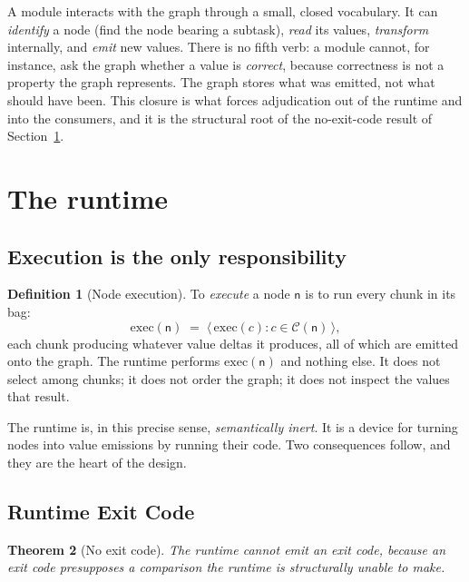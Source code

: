 \documentclass[11pt,a4paper,twocolumn]{article}
\newtheorem{theorem}{Theorem}
\theoremstyle{definition}
\newtheorem{definition}[theorem]{Definition}
\newcommand{\node}{\mathsf{n}}
\newcommand{\Chunks}{\mathcal{C}}
\newcommand{\dispatch}{\mathrm{exec}}
\begin{document}
A module interacts with the graph through a small, closed vocabulary. It can
\emph{identify} a node (find the node bearing a subtask), \emph{read} its
values, \emph{transform} internally, and \emph{emit} new values. There is no
fifth verb: a module cannot, for instance, ask the graph whether a value is
\emph{correct}, because correctness is not a property the graph represents. The
graph stores what was emitted, not what should have been. This closure is what
forces adjudication out of the runtime and into the consumers, and it is the
structural root of the no-exit-code result of Section~\ref{sec:runtime}.

\section{The runtime}
\label{sec:runtime}

\subsection{Execution is the only responsibility}

\begin{definition}[Node execution]
\label{def:exec}
To \emph{execute} a node $\node$ is to run every chunk in its bag:
\[
\dispatch(\node) \;=\; \bigl\langle\, \dispatch(c) : c \in \Chunks(\node)
\,\bigr\rangle,
\]
each chunk producing whatever value deltas it produces, all of which are emitted
onto the graph. The runtime performs $\dispatch(\node)$ and nothing else. It
does not select among chunks; it does not order the graph; it does not inspect
the values that result.
\end{definition}

The runtime is, in this precise sense, \emph{semantically inert}. It is a device
for turning nodes into value emissions by running their code. Two consequences
follow, and they are the heart of the design.

\subsection{Runtime Exit Code}

\begin{theorem}[No exit code]
\label{thm:no-exit}
The runtime cannot emit an exit code, because an exit code presupposes a
comparison the runtime is structurally unable to make.
\end{theorem}
\end{document}
